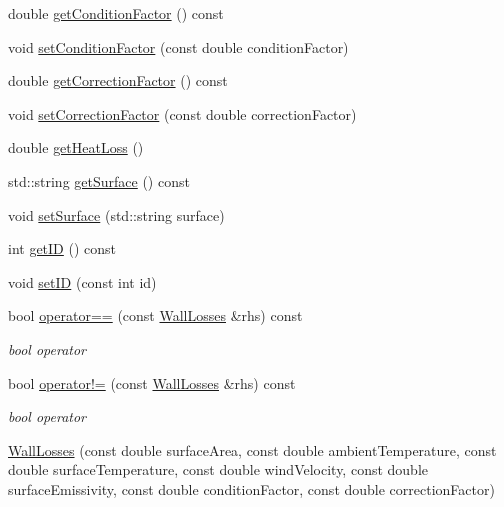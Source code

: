 \begin{DoxyCompactItemize}
\item 
double \hyperlink{class_wall_losses_a16ab4003a17f9e95f28b9390b92c2b27}{get\+Condition\+Factor} () const
\item 
void \hyperlink{class_wall_losses_a1533a7513460d22f433fb670700573a2}{set\+Condition\+Factor} (const double condition\+Factor)
\item 
double \hyperlink{class_wall_losses_a4ce6a0ec36cd868b14b041f18251cb6d}{get\+Correction\+Factor} () const
\item 
void \hyperlink{class_wall_losses_affdf3f6c3d54d73c7f91e1515fb12533}{set\+Correction\+Factor} (const double correction\+Factor)
\item 
double \hyperlink{class_wall_losses_a884da3507498878f619cbe5ba340c0ef}{get\+Heat\+Loss} ()
\item 
std\+::string \hyperlink{class_wall_losses_a10f5de20dc6fead726adbf62a9c49b09}{get\+Surface} () const
\item 
void \hyperlink{class_wall_losses_af329a27b78e1f2d84af6a48ffc59bfad}{set\+Surface} (std\+::string surface)
\item 
int \hyperlink{class_wall_losses_ae764fa8917879d8c24df7582c159fec6}{get\+ID} () const
\item 
void \hyperlink{class_wall_losses_a3a135d9bfd6c6f1c4742031ab568b26d}{set\+ID} (const int id)
\item 
\mbox{\label{class_wall_losses_ad9eebb34927690332c00df51507878e9}} 
bool \hyperlink{class_wall_losses_ad9eebb34927690332c00df51507878e9}{operator==} (const \hyperlink{class_wall_losses}{Wall\+Losses} \&rhs) const
\begin{DoxyCompactList}\small\item\em bool operator \end{DoxyCompactList}\item 
\mbox{\label{class_wall_losses_a46d50205e67870978292c4bfa1c9d329}} 
bool \hyperlink{class_wall_losses_a46d50205e67870978292c4bfa1c9d329}{operator!=} (const \hyperlink{class_wall_losses}{Wall\+Losses} \&rhs) const
\begin{DoxyCompactList}\small\item\em bool operator \end{DoxyCompactList}\item 
\hyperlink{class_wall_losses_a7d46f259c632ecdcde5ae31468c03e2e}{Wall\+Losses} (const double surface\+Area, const double ambient\+Temperature, const double surface\+Temperature, const double wind\+Velocity, const double surface\+Emissivity, const double condition\+Factor, const double correction\+Factor)

\end{DoxyCompactItemize}
